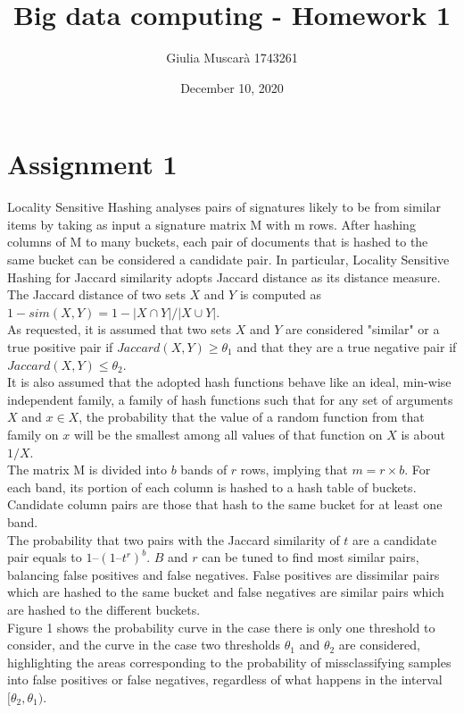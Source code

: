 \documentclass[]{report}
\title{Big data computing - Homework 1}
\author{Giulia Muscarà 1743261}
\date{December 10, 2020}
\begin{document}
\maketitle


\section*{Assignment 1}
Locality Sensitive Hashing analyses pairs of signatures likely to be from similar items by taking as input a signature matrix M with m rows. After hashing columns of M to many buckets, each pair of documents that is hashed to the same bucket can be considered a candidate pair. In particular, Locality Sensitive Hashing for Jaccard similarity adopts Jaccard distance as its distance measure. The Jaccard distance of two sets $X$ and $Y$ is computed as $1 - sim(X, Y) = 1 - |X \cap Y|/|X \cup Y|$.\\
As requested, it is assumed that two sets $X$ and $Y$ are considered "similar" or a true positive pair if $Jaccard(X,Y) \ge \theta_{1}$ and that they are a true negative pair if $Jaccard(X,Y) \le \theta_{2}$.\\
It is also assumed that the adopted hash functions behave like an ideal, min-wise independent family, a family of hash functions such that for any
set of arguments $X$ and $x \in X$, the probability that the value of a random function from that family on $x$ will be the smallest among all values of that function on $X$ is about $1/X$.\\
The matrix M is divided into $b$ bands of $r$ rows, implying that $m = r \times b$. For each band, its portion of each column is hashed to a hash table of buckets. Candidate column pairs are those that hash to the same bucket for at least one band. \\
The probability that two pairs with the Jaccard similarity of $t$ are a candidate pair equals to $1 – (1 – t^{r})^{b}$. $B$ and $r$ can be tuned to find most similar pairs, balancing false positives and false negatives. False positives are dissimilar pairs which are hashed to the same bucket and false negatives are similar pairs which are hashed to the different buckets. \\ 
Figure 1 shows the probability curve in the case there is only one threshold to consider, and the curve in the case two thresholds $\theta_{1}$ and $\theta_{2}$ are considered, highlighting the areas corresponding to the probability of missclassifying samples into false positives or false negatives, regardless of what happens in the interval $[\theta_{2}, \theta_{1})$.\\
\end{document}
